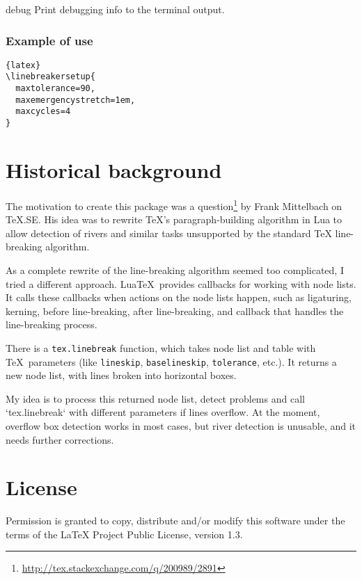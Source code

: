 \documentclass{l3doc}
\begin{document}
\begin{function}{debug}
Print debugging info to the terminal output.
\end{function}

\subsubsection{Example of \cmd{\linebreakersetup} use}

\begin{lstlisting}{latex}
\linebreakersetup{
  maxtolerance=90,
  maxemergencystretch=1em,
  maxcycles=4
}
\end{lstlisting}



\section{Historical background}

The motivation to create this package was a 
question\footnote{\url{http://tex.stackexchange.com/q/200989/2891}} by Frank Mittelbach on
TeX.SE. His idea was to rewrite TeX’s paragraph-building algorithm in Lua to
allow detection of rivers and similar tasks unsupported by the standard TeX
line-breaking algorithm.

As a complete rewrite of the line-breaking algorithm seemed too complicated, 
I tried a different approach. Lua\TeX\ provides  callbacks for working with node lists. 
It calls these callbacks when actions on the node lists happen, such as 
ligaturing, kerning, before line-breaking, after line-breaking, and 
callback that  handles the line-breaking process. 

There is a \verb|tex.linebreak| function, which takes
node list and table with \TeX\ parameters (like \verb|lineskip|, \verb|baselineskip|, \verb|tolerance|,
etc.). It returns a new node list, with lines broken into horizontal boxes.

My idea is to process this returned node list, detect problems and call
`tex.linebreak` with different parameters if lines overflow. At the
moment, overflow box detection works in most cases, but river detection is unusable, and it needs further corrections.

\section{License}

Permission is granted to copy, distribute and/or modify this software
under the terms of the LaTeX Project Public License, version 1.3.
\end{document}
